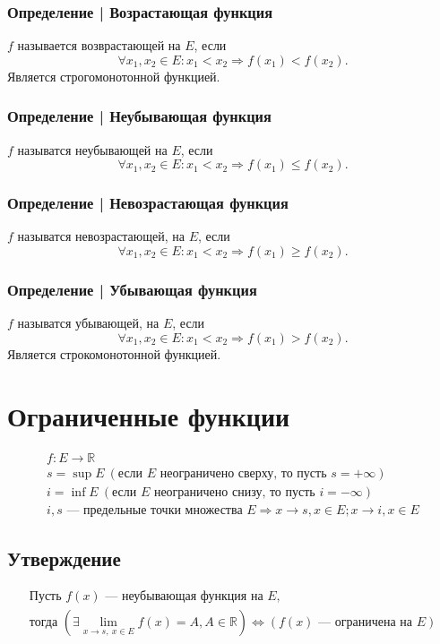 \documentclass{article}
\begin{document}
\subsubsection{Определение | Возрастающая функция}
$f$ называется возврастающей на $E$, если
\[
\forall x_1, x_2 \in E: x_1 < x_2 \Rightarrow f(x_1) < f(x_2).
\]
Является строгомонотонной функцией.

\subsubsection{Определение | Неубывающая функция}
$f$ называтся неубывающей на $E$, если
\[
    \forall x_1, x_2 \in E: x_1 < x_2 \Rightarrow f(x_1) \le f(x_2).
\]

\subsubsection{Определение | Невозрастающая функция}
$f$ называтся невозрастающей, на $E$, если
\[
    \forall x_1, x_2 \in E: x_1 < x_2 \Rightarrow f(x_1) \ge f(x_2).
\]

\subsubsection{Определение | Убывающая функция}
$f$ называтся убывающей, на $E$, если
\[
    \forall x_1, x_2 \in E: x_1 < x_2 \Rightarrow f(x_1) > f(x_2).
\]
Является строкомонотонной функцией.


\section{Ограниченные функции}
\begin{gather*}
    f: E \rightarrow \mathbb{R} \\
    s = \sup E ~ (\text{если } E \text{ неограничено сверху, то пусть } s = +\infty) \\
    i = \inf E ~ (\text{если } E \text{ неограничено снизу,  то пусть } i = -\infty) \\
    i, s \text{ --- предельные точки множества } E \Rightarrow
    x \rightarrow s, x \in E; x \rightarrow i, x \in E
\end{gather*}

\subsection{Утверждение} 
\begin{gather*}
    \text{Пусть } f(x) \text{ --- неубывающая функция на } E, \\
    \text{тогда } \left( \exists \lim_{x \to s, ~ x \in E} f(x) = A, A \in \mathbb{R} \right) \Leftrightarrow
    \left( f(x) \text{ --- ограничена на } E \right)
\end{gather*}
\end{document}
